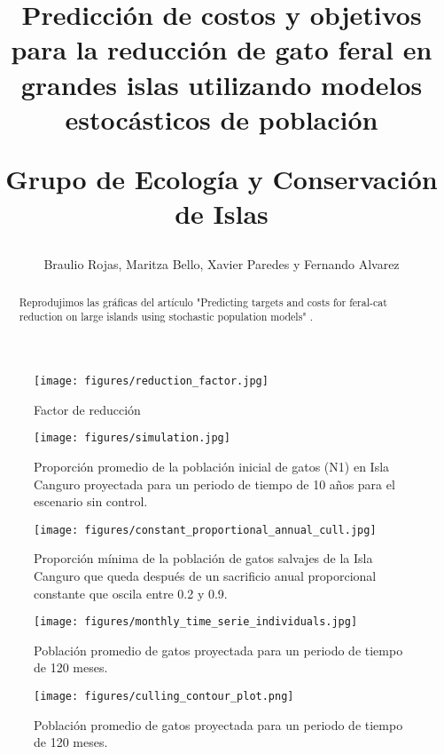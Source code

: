 \documentclass{article} %
\author{Braulio Rojas, Maritza Bello, Xavier Paredes y Fernando Alvarez}
\title{Predicción de costos y objetivos para la reducción de gato feral en grandes islas utilizando
modelos estocásticos de población \\ \begin{large} Grupo de Ecología y Conservación de Islas
\end{large}}
\begin{document}
\maketitle

\begin{abstract}

Reprodujimos las gráficas del artículo "Predicting targets and costs for feral-cat reduction on
large islands using stochastic population models" \cite{venning2021predicting}.

\end{abstract}


\begin{figure}[H]
    \centering
\texttt{[image: figures/reduction\_factor.jpg]}
\caption{Factor de reducción}
\label{fig:reductionFactor}
\end{figure}

\begin{figure}[H]
    \centering
\texttt{[image: figures/simulation.jpg]}
\caption{Proporción promedio de la población inicial de gatos (N1) en Isla Canguro proyectada para
un periodo de tiempo de 10 años para el escenario sin control.}
\label{fig:simulation}
\end{figure}

\begin{figure}[H]
    \centering
\texttt{[image: figures/constant\_proportional\_annual\_cull.jpg]}
\caption{Proporción mínima de la población de gatos salvajes de la Isla Canguro que queda después de
un sacrificio anual proporcional constante que oscila entre 0.2 y 0.9.}
\label{fig:constantProportionalAnnualCull}
\end{figure}

\begin{figure}[H]
    \centering
\texttt{[image: figures/monthly\_time\_serie\_individuals.jpg]}
\caption{Población promedio de gatos proyectada para un periodo de tiempo de 120 meses.}
\label{fig:monthlyTimeSerieIndividuals}
\end{figure}

\begin{figure}[H]
    \centering
\texttt{[image: figures/culling\_contour\_plot.png]}
\caption{Población promedio de gatos proyectada para un periodo de tiempo de 120 meses.}
\label{fig:culling_contour_plot}
\end{figure}



\end{document}
